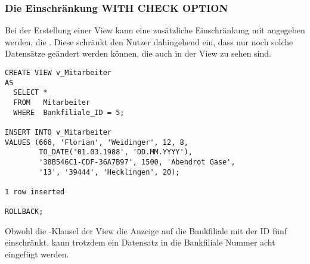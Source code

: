         \subsubsection{Die Einschränkung WITH CHECK OPTION}
          \label{CHECK}
          Bei der Erstellung einer View kann eine zusätzliche Einschränkung mit angegeben werden, die . Diese schränkt den Nutzer dahingehend ein, dass nur noch solche Datensätze geändert werden können, die auch in der View zu sehen sind.
          \begin{lstlisting}[language=oracle_sql,caption={Ein Experiment mit den CHECK OPTION},label=sql08_35]
CREATE VIEW v_Mitarbeiter
AS
  SELECT *
  FROM   Mitarbeiter
  WHERE  Bankfiliale_ID = 5;

INSERT INTO v_Mitarbeiter
VALUES (666, 'Florian', 'Weidinger', 12, 8,
        TO_DATE('01.03.1988', 'DD.MM.YYYY'),
        '38B546C1-CDF-36A7B97', 1500, 'Abendrot Gase',
        '13', '39444', 'Hecklingen', 20);

1 row inserted

ROLLBACK;
          \end{lstlisting}
          Obwohl die \WHERE-Klausel der View  die Anzeige auf die Bankfiliale mit der ID fünf einschränkt, kann trotzdem ein Datensatz in die Bankfiliale Nummer acht eingefügt werden.
		  
